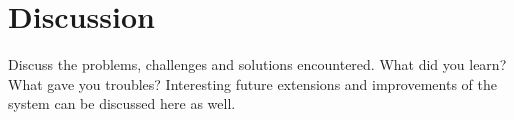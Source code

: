 \chapter{Discussion}

Discuss the problems, challenges and solutions encountered.
What did you learn? What gave you troubles? Interesting future extensions and
improvements of the system can be discussed here as well.


